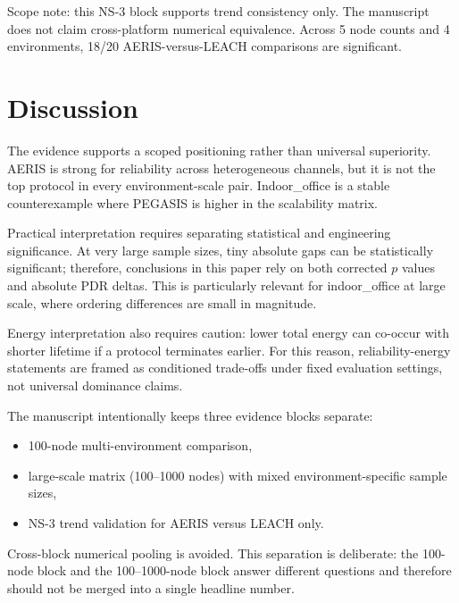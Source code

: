 ﻿\documentclass[sensors,article,submit,moreauthors,pdftex]{Definitions/mdpi}
\begin{document}
Scope note: this NS-3 block supports trend consistency only. The manuscript does not claim cross-platform numerical equivalence. Across 5 node counts and 4 environments, 18/20 AERIS-versus-LEACH comparisons are significant.

\section{Discussion}
The evidence supports a scoped positioning rather than universal superiority. AERIS is strong for reliability across heterogeneous channels, but it is not the top protocol in every environment-scale pair. Indoor\_office is a stable counterexample where PEGASIS is higher in the scalability matrix.

Practical interpretation requires separating statistical and engineering significance. At very large sample sizes, tiny absolute gaps can be statistically significant; therefore, conclusions in this paper rely on both corrected $p$ values and absolute PDR deltas. This is particularly relevant for indoor\_office at large scale, where ordering differences are small in magnitude.

Energy interpretation also requires caution: lower total energy can co-occur with shorter lifetime if a protocol terminates earlier. For this reason, reliability-energy statements are framed as conditioned trade-offs under fixed evaluation settings, not universal dominance claims.

The manuscript intentionally keeps three evidence blocks separate:
\begin{itemize}
\item 100-node multi-environment comparison,
\item large-scale matrix (100--1000 nodes) with mixed environment-specific sample sizes,
\item NS-3 trend validation for AERIS versus LEACH only.
\end{itemize}
Cross-block numerical pooling is avoided. This separation is deliberate: the 100-node block and the 100--1000-node block answer different questions and therefore should not be merged into a single headline number.
\end{document}
